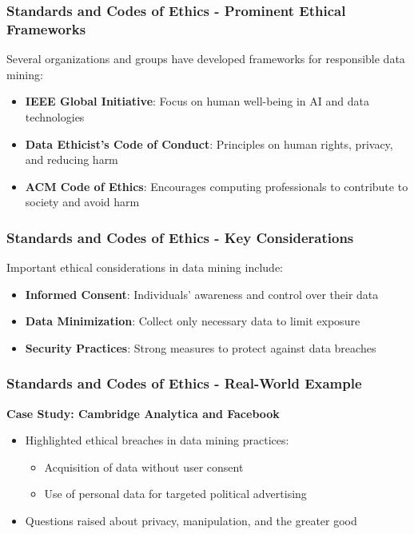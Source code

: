 \documentclass[aspectratio=169]{beamer}
\begin{document}
\begin{frame}[fragile]
    \frametitle{Standards and Codes of Ethics - Prominent Ethical Frameworks}
    Several organizations and groups have developed frameworks for responsible data mining:
    \begin{itemize}
        \item \textbf{IEEE Global Initiative}: Focus on human well-being in AI and data technologies
        \item \textbf{Data Ethicist's Code of Conduct}: Principles on human rights, privacy, and reducing harm
        \item \textbf{ACM Code of Ethics}: Encourages computing professionals to contribute to society and avoid harm
    \end{itemize}
\end{frame}

\begin{frame}[fragile]
    \frametitle{Standards and Codes of Ethics - Key Considerations}
    Important ethical considerations in data mining include:
    \begin{itemize}
        \item \textbf{Informed Consent}: Individuals' awareness and control over their data
        \item \textbf{Data Minimization}: Collect only necessary data to limit exposure
        \item \textbf{Security Practices}: Strong measures to protect against data breaches
    \end{itemize}
\end{frame}

\begin{frame}[fragile]
    \frametitle{Standards and Codes of Ethics - Real-World Example}
    \textbf{Case Study: Cambridge Analytica and Facebook}
    \begin{itemize}
        \item Highlighted ethical breaches in data mining practices:
        \begin{itemize}
            \item Acquisition of data without user consent
            \item Use of personal data for targeted political advertising
        \end{itemize}
        \item Questions raised about privacy, manipulation, and the greater good
    \end{itemize}
\end{frame}
\end{document}
